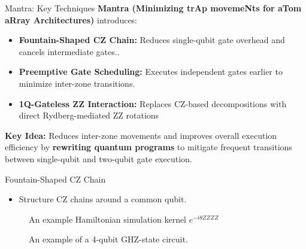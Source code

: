 \documentclass{beamer}
\begin{document}
	\begin{frame}{Mantra: Key Techniques}
		\textbf{Mantra (Minimizing trAp movemeNts for aTom aRray Architectures)} introduces:
		\begin{itemize}
			\item \textbf{Fountain-Shaped CZ Chain:} Reduces single-qubit gate overhead and cancels intermediate gates..
			\item \textbf{Preemptive Gate Scheduling:} Executes independent gates earlier to minimize inter-zone transitions.
			\item \textbf{1Q-Gateless ZZ Interaction:} Replaces CZ-based decompositions with direct Rydberg-mediated ZZ rotations
		\end{itemize}
		\textbf{Key Idea:} Reduces inter-zone movements and improves overall execution efficiency by \textbf{rewriting quantum programs} to mitigate frequent transitions between single-qubit and two-qubit gate execution.
	\end{frame}
	
	\begin{frame}{Fountain-Shaped CZ Chain}
		\begin{itemize}
			\item Structure CZ chains around a common qubit.
		\end{itemize}
		\centering
		\begin{figure}
		\caption[]{An example Hamiltonian simulation kernel $e^{-i\theta ZZZZ}$}
		\end{figure}
		\begin{figure}
			\caption[]{An example of a 4-qubit GHZ-state circuit.}
		\end{figure}
	\end{frame}
	
\end{document}
